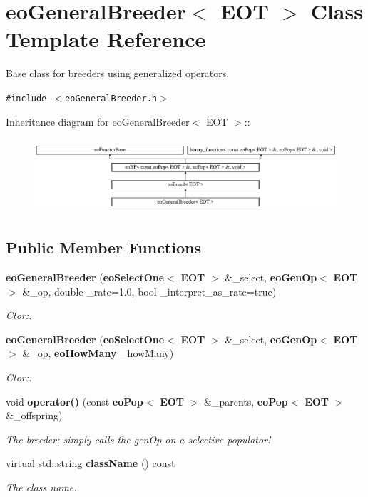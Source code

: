 \section{eo\-General\-Breeder$<$ EOT $>$ Class Template Reference}
\label{classeo_general_breeder}
Base class for breeders using generalized operators.  


{\tt \#include $<$eo\-General\-Breeder.h$>$}

Inheritance diagram for eo\-General\-Breeder$<$ EOT $>$::\begin{figure}[H]
\begin{center}
\leavevmode
\includegraphics[height=2.75184cm]{classeo_general_breeder}
\end{center}
\end{figure}
\subsection*{Public Member Functions}
\begin{CompactItemize}
\item 
{\bf eo\-General\-Breeder} ({\bf eo\-Select\-One}$<$ {\bf EOT} $>$ \&\_\-select, {\bf eo\-Gen\-Op}$<$ {\bf EOT} $>$ \&\_\-op, double \_\-rate=1.0, bool \_\-interpret\_\-as\_\-rate=true)
\begin{CompactList}\small\item\em Ctor:. \item\end{CompactList}\item 
{\bf eo\-General\-Breeder} ({\bf eo\-Select\-One}$<$ {\bf EOT} $>$ \&\_\-select, {\bf eo\-Gen\-Op}$<$ {\bf EOT} $>$ \&\_\-op, {\bf eo\-How\-Many} \_\-how\-Many)
\begin{CompactList}\small\item\em Ctor:. \item\end{CompactList}\item 
void {\bf operator()} (const {\bf eo\-Pop}$<$ {\bf EOT} $>$ \&\_\-parents, {\bf eo\-Pop}$<$ {\bf EOT} $>$ \&\_\-offspring)
\begin{CompactList}\small\item\em The breeder: simply calls the gen\-Op on a selective populator! \item\end{CompactList}\item 
virtual std::string {\bf class\-Name} () const \label{classeo_general_breeder_a3}

\begin{CompactList}\small\item\em The class name. \item\end{CompactList}\end{CompactItemize}
